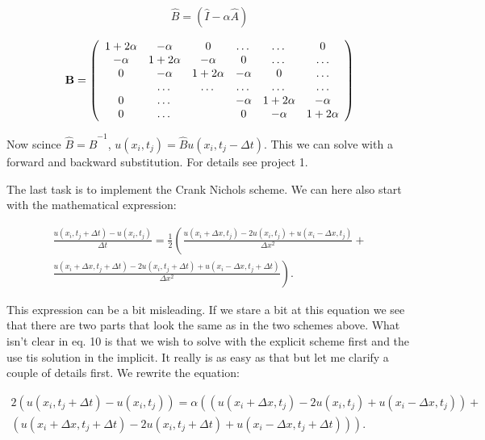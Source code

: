 \documentclass[norsk,a4paper,12pt]{article}
\begin{document}
\begin{equation}
 \hat B = (\hat I -\alpha \hat A)
\end{equation}


\begin{equation}
    {\bf B} = \left(\begin{array}{cccccc}
                           1+2\alpha& -\alpha& 0 &\dots   & \dots &0 \\
                           -\alpha & 1+2\alpha & -\alpha &0 &\dots &\dots \\
                           0&-\alpha &1+2\alpha & -\alpha & 0 & \dots \\
                           & \dots   & \dots &\dots   &\dots & \dots \\
                           0&\dots   &  &-\alpha &1+2\alpha& -\alpha \\
                           0&\dots    &  & 0  &-\alpha & 1+2\alpha \\
                      \end{array} \right)
\end{equation}

Now scince $\hat B = \hat B^{-1}$, $ u(x_i,t_j) = \hat B u(x_i,t_j-\Delta t)$. This we can solve with a forward and backward substitution.
For details see project 1.

The last task is to implement the Crank Nichols scheme. We can here also start with the mathematical expression:


\begin{equation}
\begin{split}
 \frac{u(x_i,t_j+\Delta t)-u(x_i,t_j)}{\Delta t} = \frac{1}{2}\left(\frac{u(x_i+\Delta x,t_j)-2u(x_i,t_j)+u(x_i-\Delta x,t_j)}{\Delta x^2}+\right. \\
 \left. \frac{u(x_i+\Delta x,t_j+\Delta t)-2u(x_i,t_j+\Delta t)+u(x_i-\Delta x,t_j+\Delta t)}{\Delta x^2} \right).
 \end{split}
\end{equation}

This expression can be a bit misleading. If we stare a bit at this equation we see that there are two parts that look the same as 
in the two schemes above. What isn't clear in eq. 10 is that we wish to solve with the explicit scheme first and the use tis solution
in the implicit. It really is as easy as that but let me clarify a couple of details first. We rewrite the equation: 

\begin{equation}
\begin{split}
 2(u(x_i,t_j+\Delta t)-u(x_i,t_j)) = \alpha\left( (u(x_i+\Delta x,t_j)-2u(x_i,t_j)+u(x_i-\Delta x,t_j)) +\right. \\
 \left. (u(x_i+\Delta x,t_j+\Delta t)-2u(x_i,t_j+\Delta t)+u(x_i-\Delta x,t_j+\Delta t)) \right).
 \end{split}
\end{equation}
\end{document}
